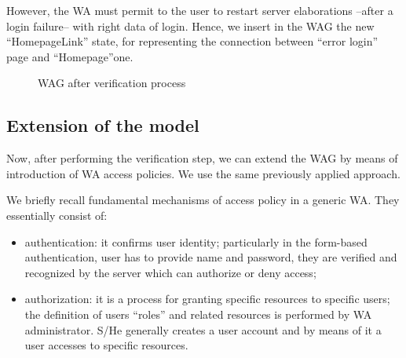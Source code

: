 However, the WA must permit to the user to restart server elaborations --after a login failure-- with right data of login. Hence, we insert in the WAG the new ``HomepageLink'' state, for representing the connection between ``error login'' page and ``Homepage''one.

\begin{figure}[ht]
\centerline{}
\caption{WAG after verification process \label{fig3}}
\end{figure}





\subsection{Extension of the model}
Now, after performing the verification step, we can extend the WAG by means of introduction of WA access policies. We use the same previously applied approach. 

We briefly recall fundamental mechanisms of access policy in a generic WA. They essentially consist of:

\footnotesize
\begin{itemize}
	\item authentication: it confirms user identity; particularly in the form-based authentication, user has to provide name and password, they are verified and recognized by the server which can authorize or deny access;
	\item authorization: it is a process for granting specific resources to specific users; the definition of users ``roles'' and related resources is performed by WA administrator. S/He generally creates a user account and by means of it a user accesses to specific resources.
\end{itemize}

